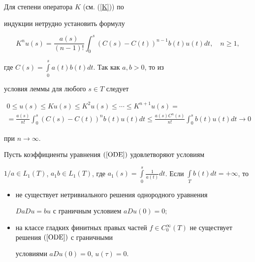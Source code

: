 \begin{pf}


Для степени оператора $K$ (см. (\ref{K})) по


индукции нетрудно установить формулу


$$


K^nu(s)=\frac{a(s)}{(n-1)!}\int_0^s


(C(s)-C(t))^{n-1}b(t)u(t)dt, \quad n \ge 1,


$$


где $C(s)=\int\limits_0^s a(t)b(t)dt$. Так как $a,b>0$, то из


условия леммы для любого $s \in T$ следует


\begin{multline*}


0 \le u(s) \le Ku(s) \le K^2u(s) \le \dotsb \le K^{n+1}u(s) =\\


%


= \frac{a(s)}{n!}\int_0^s


(C(s)-C(t))^n b(t)u(t)dt \le \frac{a(s)C^n(s)}{n!}


\int_0^s b(t)u(t) dt \to 0


\end{multline*}


при $n \to \infty$.


\end{pf}








\begin{thms}\label{NonSolve}


Пусть коэффициенты уравнения $(\ref{ODE})$ удовлетворяют условиям


$1/a \in L_1(T)$, $a_1b \in L_1(T)$, где $a_1(s) =\int\limits_0^s


\frac{1}{a(t)} dt$. Если $\int\limits_T b(t) dt = +\infty$, то


\begin{itemize}


\item[(i)] не существует нетривиального решения однородного уравнения


$DaDu=bu$ с граничным условием $aDu(0)=0;$


\item[(ii)] на классе гладких финитных правых частей $f \in


C_0^\infty(T)$ не существует решения $(\ref{ODE})$ с граничными


условиями $aDu(0)=0$, $u(\tau)=0 $.


\end{itemize}


\end{thms}








